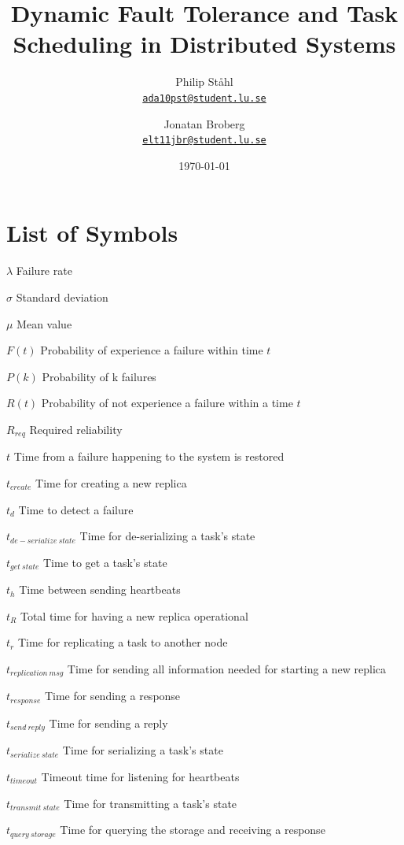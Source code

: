 \documentclass{cslthse-msc}
\author{
	Philip Ståhl \\
	{\normalsize \href{mailto:ada10pst@student.lu.se}{\texttt{ada10pst@student.lu.se}}}
	\and
	Jonatan Broberg \\
    {\normalsize \href{mailto:elt11jbr@student.lu.se}{\texttt{elt11jbr@student.lu.se}}}
}
\title{Dynamic Fault Tolerance and Task Scheduling in Distributed Systems}
\subtitle{}
\date{\today}
\newcommand{\loslabel}[1]{\makebox[3cm][l]{\textbf{#1}\ }}
\newenvironment{listofsymbols}{\begin{list}{}{\renewcommand{\makelabel}{\loslabel}}}{\end{list}}
\begin{document}
\makefrontmatter

\listoffigures
\listoftables

\chapter*{List of Symbols}
\begin{listofsymbols}
\item[$\lambda$] Failure rate
\item[$\sigma$] Standard deviation
\item[$\mu$] Mean value
\item[$F(t)$] Probability of experience a failure within time $t$
\item[$P(k)$] Probability of k failures
\item[$R(t)$] Probability of not experience a failure within a time $t$
\item[$R_{req}$] Required reliability
\item[$t$] Time from a failure happening to the system is restored
\item[$t_{create}$] Time for creating a new replica
\item[$t_d$] Time to detect a failure
\item[$t_{de-serialize\ state}$] Time for de-serializing a task's state
\item[$t_{get\ state}$] Time to get a task's state 
\item[$t_h$] Time between sending heartbeats
\item[$t_R$] Total time for having a new replica operational
\item[$t_{r}$] Time for replicating a task to another node
\item[$t_{replication\ msg}$] Time for sending all information needed for starting a new replica
\item[$t_{response}$] Time for sending a response
\item[$t_{send\ reply}$] Time for sending a reply
\item[$t_{serialize\ state}$] Time for serializing a task's state
\item[$t_{timeout}$] Timeout time for listening for heartbeats
\item[$t_{transmit\ state}$] Time for transmitting a task's state
\item[$t_{query\ storage}$] Time for querying the storage and receiving a response
\end{listofsymbols}
\end{document}
